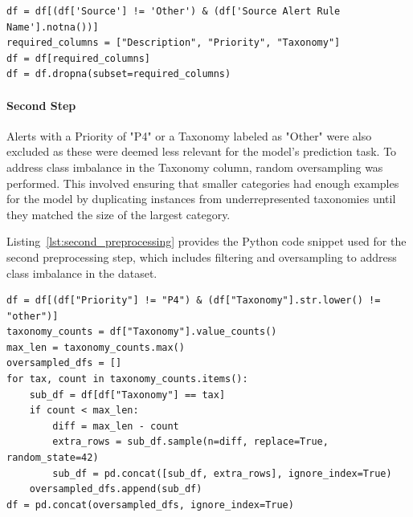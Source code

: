 \vspace{0.2cm}
\noindent
\begin{minipage}{\linewidth}
\begin{verbatim}
df = df[(df['Source'] != 'Other') & (df['Source Alert Rule Name'].notna())]
required_columns = ["Description", "Priority", "Taxonomy"]
df = df[required_columns]
df = df.dropna(subset=required_columns)
\end{verbatim}
\label{lst:first_preprocessing}
\end{minipage}
\vspace{0.1cm}

\paragraph{Second Step}
Alerts with a Priority of "P4" or a Taxonomy labeled as "Other" were also excluded as these were deemed less relevant for the model's prediction task. 
To address class imbalance in the Taxonomy column, random oversampling was performed. 
This involved ensuring that smaller categories had enough examples for the model by duplicating instances from underrepresented taxonomies until they matched the size of the largest category.

Listing~\ref{lst:second_preprocessing} provides the Python code snippet used for the second preprocessing step, which includes filtering and oversampling to address class imbalance in the dataset. 

\vspace{0.2cm}
\noindent
\begin{minipage}{\linewidth}
\begin{verbatim}
df = df[(df["Priority"] != "P4") & (df["Taxonomy"].str.lower() != "other")]
taxonomy_counts = df["Taxonomy"].value_counts()
max_len = taxonomy_counts.max()
oversampled_dfs = []
for tax, count in taxonomy_counts.items():
    sub_df = df[df["Taxonomy"] == tax]
    if count < max_len:
        diff = max_len - count
        extra_rows = sub_df.sample(n=diff, replace=True, random_state=42)
        sub_df = pd.concat([sub_df, extra_rows], ignore_index=True)
    oversampled_dfs.append(sub_df)
df = pd.concat(oversampled_dfs, ignore_index=True)
\end{verbatim}
\label{lst:second_preprocessing}
\end{minipage}
\vspace{0.1cm}

